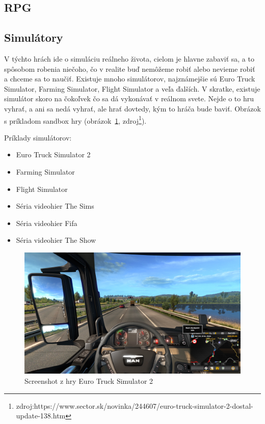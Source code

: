 \documentclass[10pt,oneside,slovak,a4paper]{article}
\begin{document}
\subsection{RPG} \label{zanre:rpg}



\subsection{Simulátory} \label{zanre:simulatory}

V týchto hrách ide o simuláciu reálneho života, cielom je hlavne zabaviť sa, a to spôsobom robenia niečoho, čo v realite buď nemôžeme robiť alebo nevieme robiť a chceme sa to naučiť. Existuje mnoho simulátorov, najznámejšie sú Euro Truck Simulator, Farming Simulator, Flight Simulator a veľa ďalších. V skratke, existuje simulátor skoro na čokoľvek čo sa dá vykonávať v reálnom svete. Nejde o to hru vyhrať, a ani sa nedá vyhrať, ale hrať dovtedy, kým to hráča bude baviť. Obrázok s príkladom sandbox hry (obrázok~\ref{f:ets2}, zdroj\footnote{zdroj:https://www.sector.sk/novinka/244607/euro-truck-simulator-2-dostal-update-138.htm}).

Príklady simulátorov:
\begin{itemize}
\item Euro Truck Simulator 2
\item Farming Simulator
\item Flight Simulator
\item Séria videohier The Sims
\item Séria videohier Fifa
\item Séria videohier The Show
\end{itemize}

\begin{figure}[tbh]
\centering
\includegraphics[scale=0.15]{ets.jpg}
\caption{Screenshot z hry Euro Truck Simulator 2}
\label{f:ets2}
\end{figure}
\end{document}
